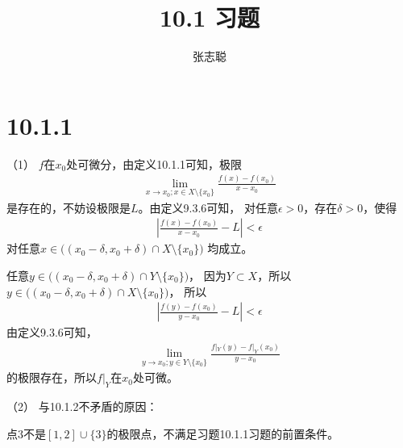 \documentclass{article}
\begin{document}
\title{10.1 习题}
\author{张志聪}
\maketitle

\section*{10.1.1}

（1）
$f$在$x_0$处可微分，由定义10.1.1可知，极限
\begin{align*}
  \lim\limits_{x \to x_0; x \in X \setminus \{x_0\}} \frac{f(x) - f(x_0)}{x - x_0}
\end{align*}
是存在的，不妨设极限是$L$。由定义9.3.6可知，
对任意$\epsilon > 0$，存在$\delta > 0$，使得
\begin{align*}
  |\frac{f(x) - f(x_0)}{x - x_0} - L | < \epsilon
\end{align*}
对任意$x \in \big((x_0 - \delta, x_0 + \delta) \cap X \setminus \{x_0\}\big)$
均成立。

任意$y \in \big((x_0 - \delta, x_0 + \delta) \cap Y \setminus \{x_0\}\big)$，
因为$Y \subset X$，所以$y \in \big((x_0 - \delta, x_0 + \delta) \cap X \setminus \{x_0\}\big)$，
所以
\begin{align*}
  |\frac{f(y) - f(x_0)}{y - x_0} - L | < \epsilon
\end{align*}
由定义9.3.6可知，
\begin{align*}
  \lim\limits_{y \to x_0; y \in Y \setminus \{x_0\}} \frac{f|_Y(y) - f|_Y(x_0)}{y - x_0}
\end{align*}
的极限存在，所以$f|_Y$在$x_0$处可微。

（2）
与10.1.2不矛盾的原因：

点$3$不是$[1,2] \cup \{3\}$的极限点，不满足习题10.1.1习题的前置条件。
\end{document}
